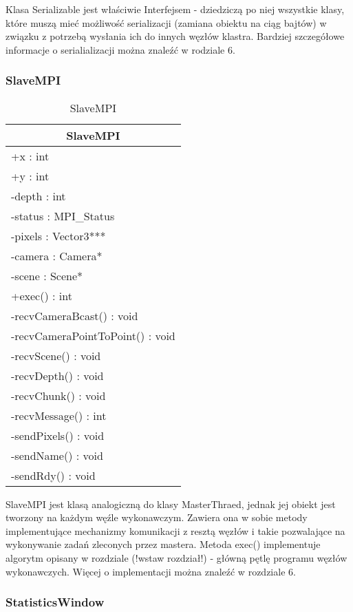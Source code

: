 Klasa Serializable jest właściwie Interfejsem - dziedziczą po niej wszystkie klasy, które muszą mieć możliwość serializacji (zamiana obiektu na ciąg bajtów) w związku z potrzebą wysłania ich do innych węzłów klastra. Bardziej szczegółowe informacje o serialializacji można znaleźć w rodziale 6.

\subsubsection{SlaveMPI}

\footnotesize
\begin{longtable}{|p{14cm}|}
    \caption{SlaveMPI} \label{tab:SlaveMPI} \\ \hline
    \multicolumn{1}{|c|}{SlaveMPI} \\ \hline
    +x : int \\ 
	+y : int \\
	-depth : int \\
	-status : MPI\_Status \\
	-pixels : Vector3*** \\
	-camera : Camera* \\
	-scene : Scene* \\ \hline
	+exec() : int \\
	-recvCameraBcast() : void \\
	-recvCameraPointToPoint() : void \\
	-recvScene() : void \\
	-recvDepth() : void \\
	-recvChunk() : void \\
	-recvMessage() : int \\
	-sendPixels() : void \\
	-sendName() : void \\
	-sendRdy() : void \\
	\hline
\end{longtable}
\normalsize

SlaveMPI jest klasą analogiczną do klasy MasterThraed, jednak jej obiekt jest tworzony na każdym węźle wykonawczym. Zawiera ona w sobie metody implementujące mechanizmy komunikacji z resztą węzłów i takie pozwalające na wykonywanie zadań zleconych przez mastera. Metoda exec() implementuje algorytm opisany w rozdziale (!wstaw rozdział!) - główną pętlę programu węzłów wykonawczych. Więcej o implementacji można znaleźć w rozdziale 6.

\subsubsection{StatisticsWindow}

